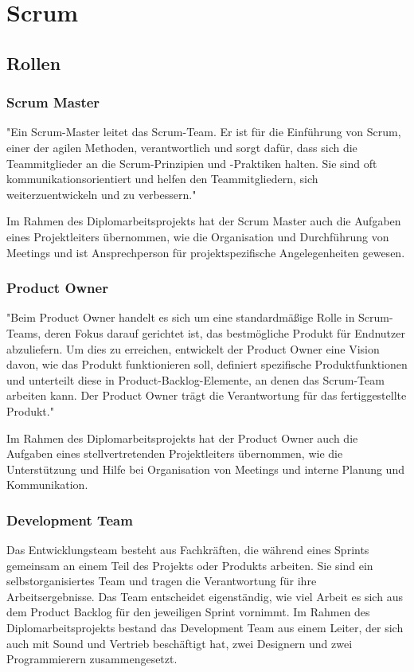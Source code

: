 
\section{Scrum}\label{sec:scrum}

\renewcommand{\kapitelautor}{Autor: Nils Hubmann} %

\subsection{Rollen}\label{subsec:rollen}

%
\subsubsection{Scrum Master}\label{subsubsec:Scrum-Master}
%
"Ein Scrum-Master leitet das Scrum-Team.
Er ist für die Einführung von Scrum, einer der agilen Methoden, verantwortlich und sorgt dafür, dass sich die Teammitglieder an die Scrum-Prinzipien und -Praktiken halten.
Sie sind oft kommunikationsorientiert und helfen den Teammitgliedern, sich weiterzuentwickeln und zu verbessern."

Im Rahmen des Diplomarbeitsprojekts hat der Scrum Master auch die Aufgaben eines Projektleiters übernommen, wie die Organisation und Durchführung von Meetings und ist Ansprechperson für projektspezifische Angelegenheiten gewesen.

%
\subsubsection{Product Owner}\label{subsubsec:Product-Owner}
%
"Beim Product Owner handelt es sich um eine standardmäßige Rolle in Scrum-Teams, deren Fokus darauf gerichtet ist, das bestmögliche Produkt für Endnutzer abzuliefern.
Um dies zu erreichen, entwickelt der Product Owner eine Vision davon, wie das Produkt funktionieren soll, definiert spezifische Produktfunktionen und unterteilt diese in Product-Backlog-Elemente, an denen das Scrum-Team arbeiten kann.
Der Product Owner trägt die Verantwortung für das fertiggestellte Produkt."

Im Rahmen des Diplomarbeitsprojekts hat der Product Owner auch die Aufgaben eines stellvertretenden Projektleiters übernommen, wie die Unterstützung und Hilfe bei Organisation von Meetings und interne Planung und Kommunikation.
%
\subsubsection{Development Team}\label{subsubsec:Development-Team}
%
Das Entwicklungsteam besteht aus Fachkräften, die während eines Sprints gemeinsam an einem Teil des Projekts oder Produkts arbeiten.
Sie sind ein selbstorganisiertes Team und tragen die Verantwortung für ihre Arbeitsergebnisse. Das Team entscheidet eigenständig, wie viel Arbeit es sich aus dem Product Backlog für den jeweiligen Sprint vornimmt.
Im Rahmen des Diplomarbeitsprojekts bestand das Development Team aus einem Leiter, der sich auch mit Sound und Vertrieb beschäftigt hat, zwei Designern und zwei Programmierern zusammengesetzt.
%
